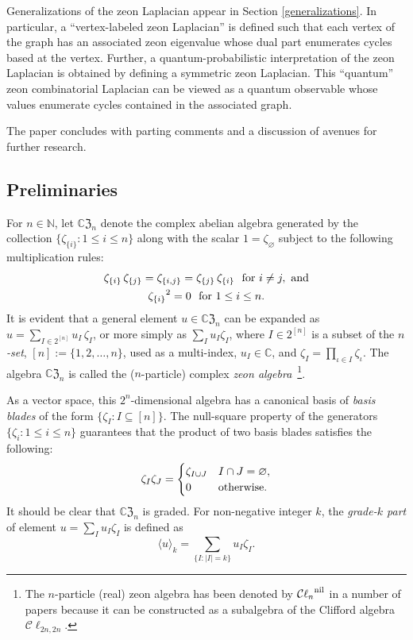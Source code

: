 \documentclass{article}
\theoremstyle{definition}
\newcommand{\CZ}{\mathbb{C}\mathfrak{Z}}
\numberwithin{equation}{section}
\begin{document}
Generalizations of the zeon Laplacian appear in Section \ref{generalizations}.  In particular, a ``vertex-labeled zeon Laplacian'' is defined such that each vertex of the graph has an associated zeon eigenvalue whose dual part enumerates cycles based at the vertex.  Further, a quantum-probabilistic interpretation of the zeon Laplacian is obtained by defining a symmetric zeon Laplacian.  This ``quantum'' zeon combinatorial Laplacian can be viewed as a quantum observable whose values enumerate cycles contained in the associated graph. 

The paper concludes with parting comments and a discussion of avenues for further research.

\subsection{Preliminaries}\label{preliminaries}

For $n\in\mathbb{N}$,  let $\CZ_n$ denote the complex abelian algebra generated by the collection $\{\zeta_{\{i\}}: 1\le i\le n\}$ along with the scalar $1=\zeta_\varnothing$ subject to the following multiplication rules:
\begin{gather*}
\zeta_{\{i\}}\,\zeta_{\{j\}}=\zeta_{\{i,j\}}=\zeta_{\{j\}}\,\zeta_{\{i\}}\,\,\text{ \rm
for }i\ne j,\text{ \rm and}\\
{\zeta_{\{i\}}}^2=0\,\,\text{ \rm for }1\le i\le n.
\end{gather*}
It is evident that a general element $u\in\CZ_n$ can be expanded as $u=\displaystyle\sum_{I\in2^{[n]}}u_{I}\,\zeta_{I}$, or more simply as $\sum_I u_I\zeta_I$,  where $I\in2^{[n]}$ is a subset of the {\em $n$-set}, $[n]:=\{1,2,\ldots,n\}$, used as a multi-index, $u_{I}\in\mathbb{C}$, and $\displaystyle\zeta_{I}=\prod_{\iota\in I}\zeta_\iota$.  The algebra $\CZ_n$ is called the ($n$-particle) complex {\em zeon algebra}~\footnote{The $n$-particle (real) zeon algebra has been denoted by ${\mathcal{C}\ell_n}^{\rm nil}$ in a number of papers because it can be constructed as a subalgebra of the Clifford algebra $\mathcal{C}\ell_{2n,2n}$.}.  

As a vector space, this $2^n$-dimensional algebra has a canonical basis of  {\em basis blades} of the form $\{\zeta_I: I\subseteq [n]\}$.  The null-square property of the generators $\{\zeta_i:1\le i\le n\}$ guarantees that the product of two basis blades satisfies the following:\begin{equation}\label{blade product}
\zeta_I\zeta_J=\begin{cases}
\zeta_{I\cup J}& I\cap J=\varnothing,\\
0&\text{\rm otherwise.}
\end{cases}
\end{equation}
It should be clear that $\CZ_n$ is graded.  For non-negative integer $k$, the {\em grade-$k$ part} of element $u=\sum_I u_I\zeta_I$ is defined as \begin{equation*}
\langle u\rangle_k=\sum_{\{I:|I|=k\}}u_I\zeta_I.
\end{equation*}
\end{document}
